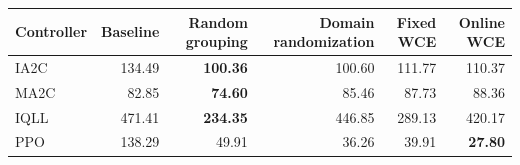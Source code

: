 \begin{tabular}{lrrrrr}
\hline
Controller & Baseline & Random grouping & Domain randomization & Fixed WCE & Online WCE \\
\hline
IA2C & 134.49 & \textbf{100.36} & 100.60 & 111.77 & 110.37 \\
MA2C & 82.85 & \textbf{74.60} & 85.46 & 87.73 & 88.36 \\
IQLL & 471.41 & \textbf{234.35} & 446.85 & 289.13 & 420.17 \\
PPO & 138.29 & 49.91 & 36.26 & 39.91 & \textbf{27.80} \\
\hline
\end{tabular}
